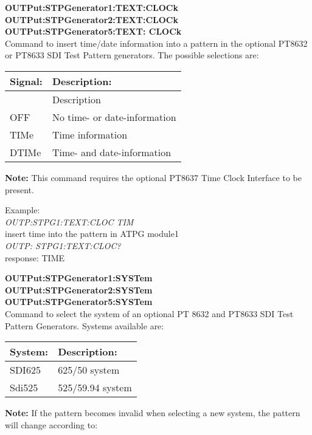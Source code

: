 \textbf{OUTPut:STPGenerator1:TEXT:CLOCk}\\
\textbf{OUTPut:STPGenerator2:TEXT:CLOCk}\\
\textbf{OUTPut:STPGenerator5:TEXT: CLOCk}\\
Command to insert time/date information into a pattern in the optional PT8632 or PT8633 SDI Test Pattern generators. The possible selections are:

\begin{tabular}{|l|l|}
\hline
\textbf{Signal:} & \textbf{Description:} \\ \hline
			& Description \\ \hline
OFF		& No time- or date-information\\ \hline
TIMe	& Time information\\ \hline
DTIMe	& Time- and date-information\\ \hline
\end{tabular}

\textbf{Note:} This command requires the optional PT8637 Time Clock Interface to be present.

Example:\\
\textit{OUTP:STPG1:TEXT:CLOC TIM}\\
insert time into the pattern in ATPG module1\\
\textit{OUTP: STPG1:TEXT:CLOC?}\\
response: TIME

\textbf{OUTPut:STPGenerator1:SYSTem}\\
\textbf{OUTPut:STPGenerator2:SYSTem}\\
\textbf{OUTPut:STPGenerator5:SYSTem}\\
Command to select the system of an optional PT 8632 and PT8633 SDI Test Pattern Generators. Systems available are:

\begin{tabular}{|l|l|}
\hline
System:	& Description: \\ \hline
SDI625	& 625/50 system \\ \hline
Sdi525	& 525/59.94 system \\ \hline
\end{tabular}

\textbf{Note:} If the pattern becomes invalid when selecting a new system, the pattern will change according to:


